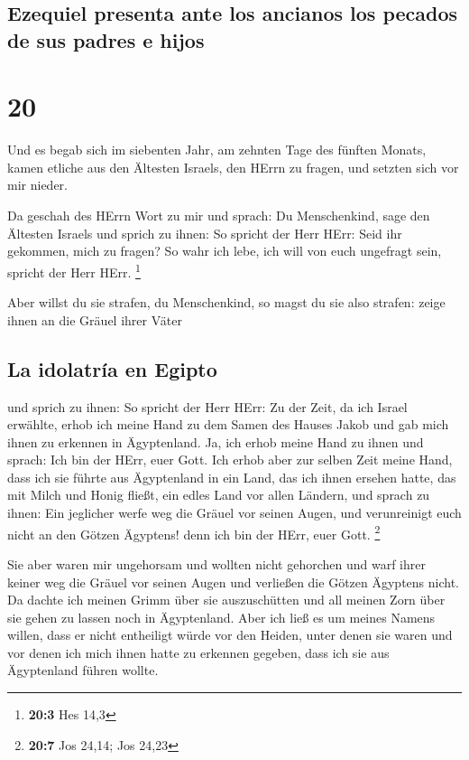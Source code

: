 \hypertarget{ezequiel-presenta-ante-los-ancianos-los-pecados-de-sus-padres-e-hijos}{%
\subsection{Ezequiel presenta ante los ancianos los pecados de sus
padres e
hijos}\label{ezequiel-presenta-ante-los-ancianos-los-pecados-de-sus-padres-e-hijos}}

\hypertarget{section-19}{%
\section{20}\label{section-19}}

 Und es begab sich im siebenten Jahr, am zehnten Tage des
fünften Monats, kamen etliche aus den Ältesten Israels, den HErrn zu
fragen, und setzten sich vor mir nieder.

 Da geschah des HErrn Wort zu mir und sprach:
 Du Menschenkind, sage den Ältesten Israels und sprich zu
ihnen: So spricht der Herr HErr: Seid ihr gekommen, mich zu fragen? So
wahr ich lebe, ich will von euch ungefragt sein, spricht der Herr HErr.
\footnote{\textbf{20:3} Hes 14,3}

 Aber willst du sie strafen, du Menschenkind, so magst du
sie also strafen: zeige ihnen an die Gräuel ihrer Väter

\hypertarget{la-idolatruxeda-en-egipto}{%
\subsection{La idolatría en Egipto}\label{la-idolatruxeda-en-egipto}}

 und sprich zu ihnen: So spricht der Herr HErr: Zu der
Zeit, da ich Israel erwählte, erhob ich meine Hand zu dem Samen des
Hauses Jakob und gab mich ihnen zu erkennen in Ägyptenland. Ja, ich
erhob meine Hand zu ihnen und sprach: Ich bin der HErr, euer Gott.
 Ich erhob aber zur selben Zeit meine Hand, dass ich sie
führte aus Ägyptenland in ein Land, das ich ihnen ersehen hatte, das mit
Milch und Honig fließt, ein edles Land vor allen Ländern, 
und sprach zu ihnen: Ein jeglicher werfe weg die Gräuel vor seinen
Augen, und verunreinigt euch nicht an den Götzen Ägyptens! denn ich bin
der HErr, euer Gott. \footnote{\textbf{20:7} Jos 24,14; Jos 24,23}

 Sie aber waren mir ungehorsam und wollten nicht gehorchen
und warf ihrer keiner weg die Gräuel vor seinen Augen und verließen die
Götzen Ägyptens nicht. Da dachte ich meinen Grimm über sie auszuschütten
und all meinen Zorn über sie gehen zu lassen noch in Ägyptenland.
 Aber ich ließ es um meines Namens willen, dass er nicht
entheiligt würde vor den Heiden, unter denen sie waren und vor denen ich
mich ihnen hatte zu erkennen gegeben, dass ich sie aus Ägyptenland
führen wollte.

